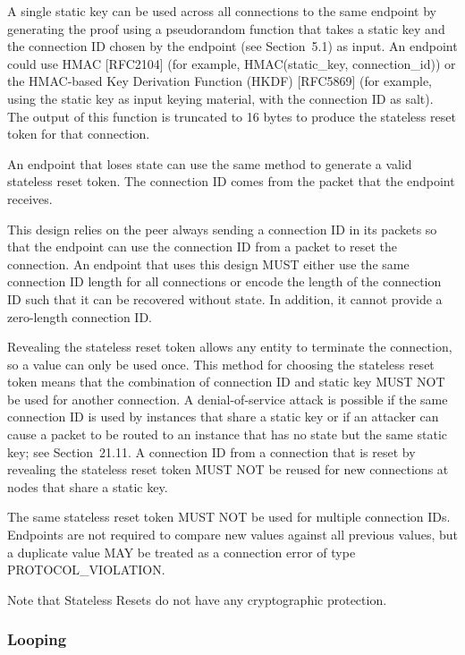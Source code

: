 \documentclass{article}
\begin{document}
A single static key can be used across all connections to the same endpoint by generating the proof using a pseudorandom function that takes a static key and the connection ID chosen by the endpoint (see Section~5.1) as input.  An endpoint could use HMAC [RFC2104] (for example, HMAC(static\_key, connection\_id)) or the HMAC-based Key Derivation Function (HKDF) [RFC5869] (for example, using the static key as input keying material, with the connection ID as salt).  The output of this function is truncated to 16 bytes to produce the stateless reset token for that connection.

An endpoint that loses state can use the same method to generate a valid stateless reset token.  The connection ID comes from the packet that the endpoint receives.

This design relies on the peer always sending a connection ID in its packets so that the endpoint can use the connection ID from a packet to reset the connection.  An endpoint that uses this design MUST either use the same connection ID length for all connections or encode the length of the connection ID such that it can be recovered without state.  In addition, it cannot provide a zero-length connection ID.

Revealing the stateless reset token allows any entity to terminate the connection, so a value can only be used once.  This method for choosing the stateless reset token means that the combination of connection ID and static key MUST NOT be used for another connection. A denial-of-service attack is possible if the same connection ID is used by instances that share a static key or if an attacker can cause a packet to be routed to an instance that has no state but the same static key; see Section~21.11.  A connection ID from a connection that is reset by revealing the stateless reset token MUST NOT be reused for new connections at nodes that share a static key.

The same stateless reset token MUST NOT be used for multiple connection IDs.  Endpoints are not required to compare new values against all previous values, but a duplicate value MAY be treated as a connection error of type PROTOCOL\_VIOLATION.

Note that Stateless Resets do not have any cryptographic protection.

\subsubsection{Looping}
\end{document}
